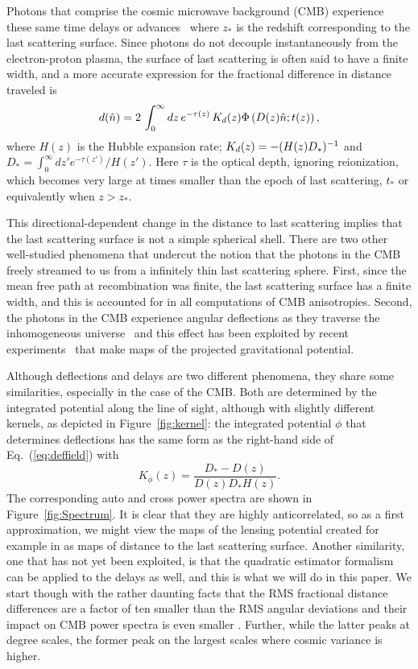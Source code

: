 \documentclass[prd,amsmath,amssymb,floatfix,superscriptaddress,nofootinbib,twocolumn]{revtex4-1}
\def\be{\begin{equation}}
\def\ee{\end{equation}}
\newcommand{\ec}[1]{Eq.~(\ref{eq:#1})}
\newcommand{\eql}[1]{\label{eq:#1}}
\newcommand{\rf}[1]{\ref{fig:#1}}
\begin{document}
Photons that comprise the cosmic microwave background (CMB) experience these same time delays or advances~\cite{Hu:2001yq} where $z_*$ is the redshift corresponding to the last scattering surface. Since photons do not decouple instantaneously from the electron-proton plasma, the surface of last scattering is often said to have a finite width, and a more accurate expression for the fractional difference in distance traveled is
\be
\fd(\hat n) = 2\, \int_0^{\infty} dz \, e^{-\tau(z)}\, K_\fd(z)\Phi\left(D(z)\hat n; t(z)\right) ,
\eql{deffield}
\ee
where $H(z)$ is the Hubble expansion rate; $K_d(z) =  -(H(z)D_*)^{-1}$ and $D_* =  \int_0^\infty dz' e^{-\tau(z') }/H(z')$.  Here 
 $\tau$ is the optical depth, ignoring reionization, which becomes very large at times smaller than the epoch of  last scattering, $t_*$ or equivalently when $z>z_*$.

This directional-dependent change in the distance to last scattering implies that the last scattering surface is not a simple spherical shell. There are two other well-studied phenomena that undercut the notion that the photons in the CMB freely streamed to us from a infinitely thin last scattering sphere. First, since the mean free path at recombination was finite, the last scattering surface has a finite width, and this is accounted for in all computations of CMB anisotropies. Second, the photons in the CMB experience angular deflections as they traverse the inhomogeneous universe~\cite{Hu:2001tn,Lewis:2006fu} and this effect has been exploited by recent experiments~\cite{Smith:2007rg,Ade:2013tyw,Story:2014hni,Sherwin:2016tyf,Aghanim:2018oex} that make maps of the projected gravitational potential.

Although deflections and delays are two different phenomena, they share some similarities, especially in the case of the CMB. Both are determined by the integrated potential along the line of sight, although with slightly different kernels, as depicted in Figure~\rf{kernel}: the integrated potential $\phi$ that determines deflections has the same form as the right-hand side of \ec{deffield}  with
\be
K_\phi(z) = \frac{D_*-D(z)}{ D(z) D_* H(z)} .
\ee
The corresponding auto and cross power spectra are shown in Figure~\rf{Spectrum}.
It is clear that they are highly anticorrelated, so as a first approximation, we might view the maps of the lensing potential created for example in \citet{Aghanim:2018oex} as  maps of distance to the last scattering surface. Another similarity, one that has not yet been exploited, is that the quadratic estimator formalism  \cite{Hu:2001tn} can be applied to the delays as well, and this is what we will do in this paper.  We start though with the rather daunting facts that the RMS fractional distance differences are a factor of ten smaller than the RMS angular deviations 
 and their impact on CMB power spectra is even smaller \cite{Hu:2001yq}. Further, while the latter peaks at degree scales, the former peak on the largest scales where cosmic variance is
 higher.  
\end{document}
